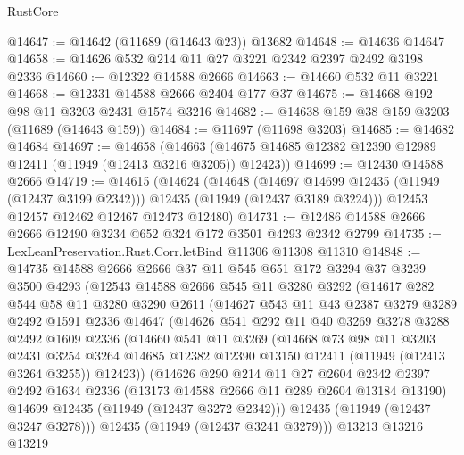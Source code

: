 \begin{lexlean}{RustCore}
\begin{coremodule}
@14647 := @14642 (@11689 (@14643 @23)) @13682
@14648 := @14636 @14647
@14658 := @14626 @532 @214 @11 @27 @3221 @2342 @2397 @2492 @3198 @2336
@14660 := @12322 @14588 @2666
@14663 := @14660 @532 @11 @3221
@14668 := @12331 @14588 @2666 @2404 @177 @37
@14675 := @14668 @192 @98 @11 @3203 @2431 @1574 @3216
@14682 := @14638 @159 @38 @159 @3203 (@11689 (@14643 @159))
@14684 := @11697 (@11698 @3203)
@14685 := @14682 @14684
@14697 := @14658
    (@14663 (@14675 @14685 @12382 @12390 @12989 @12411 (@11949 (@12413 @3216 @3205)) @12423))
@14699 := @12430 @14588 @2666
@14719 := @14615
    (@14624
      (@14648
        (@14697 @14699 @12435 (@11949 (@12437 @3199 @2342)))
        @12435
        (@11949 (@12437 @3189 @3224)))
      @12453
      @12457
      @12462
      @12467
      @12473
      @12480)
@14731 := @12486 @14588 @2666 @2666 @12490 @3234 @652 @324 @172 @3501 @4293 @2342 @2799
@14735 := LexLeanPreservation.Rust.Corr.letBind @11306 @11308 @11310
@14848 := @14735
    @14588
    @2666
    @2666
    @37
    @11
    @545
    @651
    @172
    @3294
    @37
    @3239
    @3500
    @4293
    (@12543
      @14588
      @2666
      @545
      @11
      @3280
      @3292
      (@14617
        @282
        @544
        @58
        @11
        @3280
        @3290
        @2611
        (@14627
          @543
          @11
          @43
          @2387
          @3279
          @3289
          @2492
          @1591
          @2336
          @14647
          (@14626
            @541
            @292
            @11
            @40
            @3269
            @3278
            @3288
            @2492
            @1609
            @2336
            (@14660
              @541
              @11
              @3269
              (@14668
                @73
                @98
                @11
                @3203
                @2431
                @3254
                @3264
                @14685
                @12382
                @12390
                @13150
                @12411
                (@11949 (@12413 @3264 @3255))
                @12423))
            (@14626
              @290
              @214
              @11
              @27
              @2604
              @2342
              @2397
              @2492
              @1634
              @2336
              (@13173 @14588 @2666 @11 @289 @2604 @13184 @13190)
              @14699
              @12435
              (@11949 (@12437 @3272 @2342)))
            @12435
            (@11949 (@12437 @3247 @3278)))
          @12435
          (@11949 (@12437 @3241 @3279)))
        @13213
        @13216
        @13219

\end{coremodule}
\end{lexlean}
